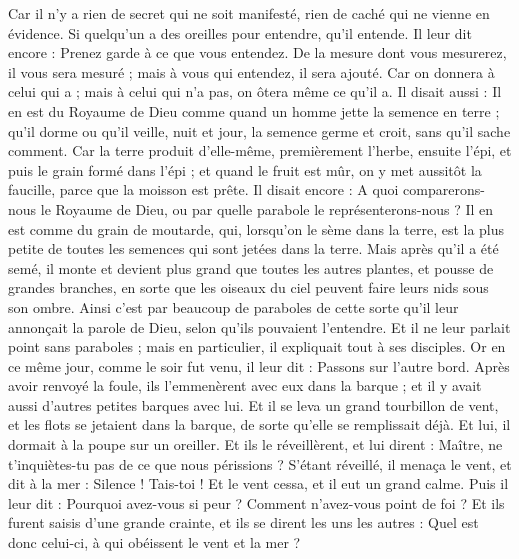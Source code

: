 \begin{multicols}{2}
Car il n'y a rien de secret qui ne soit manifesté, rien de caché qui ne vienne en évidence.
Si quelqu'un a des oreilles pour entendre, qu'il entende.
Il leur dit encore : Prenez garde à ce que vous entendez. De la mesure dont vous mesurerez, il vous sera mesuré ; mais à vous qui entendez, il sera ajouté.
Car on donnera à celui qui a ; mais à celui qui n'a pas, on ôtera même ce qu'il a.
Il disait aussi : Il en est du Royaume de Dieu comme quand un homme jette la semence en terre ;
qu'il dorme ou qu'il veille, nuit et jour, la semence germe et croit, sans qu'il sache comment.
Car la terre produit d'elle-même, premièrement l'herbe, ensuite l'épi, et puis le grain formé dans l'épi ;
et quand le fruit est mûr, on y met aussitôt la faucille, parce que la moisson est prête.
Il disait encore : A quoi comparerons-nous le Royaume de Dieu, ou par quelle parabole le représenterons-nous ?
Il en est comme du grain de moutarde, qui, lorsqu'on le sème dans la terre, est la plus petite de toutes les semences qui sont jetées dans la terre.
Mais après qu'il a été semé, il monte et devient plus grand que toutes les autres plantes, et pousse de grandes branches, en sorte que les oiseaux du ciel peuvent faire leurs nids sous son ombre.
Ainsi c'est par beaucoup de paraboles de cette sorte qu'il leur annonçait la parole de Dieu, selon qu'ils pouvaient l'entendre.
Et il ne leur parlait point sans paraboles ; mais en particulier, il expliquait tout à ses disciples.
Or en ce même jour, comme le soir fut venu, il leur dit : Passons sur l'autre bord.
Après avoir renvoyé la foule, ils l'emmenèrent avec eux dans la barque ; et il y avait aussi d'autres petites barques avec lui.
Et il se leva un grand tourbillon de vent, et les flots se jetaient dans la barque, de sorte qu'elle se remplissait déjà.
Et lui, il dormait à la poupe sur un oreiller. Et ils le réveillèrent, et lui dirent : Maître, ne t'inquiètes-tu pas de ce que nous périssions ?
S'étant réveillé, il menaça le vent, et dit à la mer : Silence ! Tais-toi ! Et le vent cessa, et il eut un grand calme.
Puis il leur dit : Pourquoi avez-vous si peur ? Comment n'avez-vous point de foi ?
Et ils furent saisis d'une grande crainte, et ils se dirent les uns les autres : Quel est donc celui-ci, à qui obéissent le vent et la mer ?

\end{multicols}
